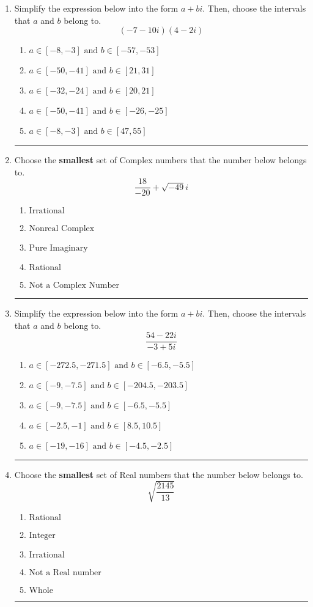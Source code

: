 \documentclass[14pt]{extbook}
\newcommand{\litem}[1]{\item#1\hspace*{-1cm}\rule{\textwidth}{0.4pt}}
\begin{document}
\begin{enumerate}
\litem{
Simplify the expression below into the form $a+bi$. Then, choose the intervals that $a$ and $b$ belong to.\[ (-7 - 10 i)(4 - 2 i) \]\begin{enumerate}[label=\Alph*.]
\item \( a \in [-8, -3] \text{ and } b \in [-57, -53] \)
\item \( a \in [-50, -41] \text{ and } b \in [21, 31] \)
\item \( a \in [-32, -24] \text{ and } b \in [20, 21] \)
\item \( a \in [-50, -41] \text{ and } b \in [-26, -25] \)
\item \( a \in [-8, -3] \text{ and } b \in [47, 55] \)

\end{enumerate} }
\litem{
Choose the \textbf{smallest} set of Complex numbers that the number below belongs to.\[ \frac{18}{-20}+\sqrt{-49}i \]\begin{enumerate}[label=\Alph*.]
\item \( \text{Irrational} \)
\item \( \text{Nonreal Complex} \)
\item \( \text{Pure Imaginary} \)
\item \( \text{Rational} \)
\item \( \text{Not a Complex Number} \)

\end{enumerate} }
\litem{
Simplify the expression below into the form $a+bi$. Then, choose the intervals that $a$ and $b$ belong to.\[ \frac{54 - 22 i}{-3 + 5 i} \]\begin{enumerate}[label=\Alph*.]
\item \( a \in [-272.5, -271.5] \text{ and } b \in [-6.5, -5.5] \)
\item \( a \in [-9, -7.5] \text{ and } b \in [-204.5, -203.5] \)
\item \( a \in [-9, -7.5] \text{ and } b \in [-6.5, -5.5] \)
\item \( a \in [-2.5, -1] \text{ and } b \in [8.5, 10.5] \)
\item \( a \in [-19, -16] \text{ and } b \in [-4.5, -2.5] \)

\end{enumerate} }
\litem{
Choose the \textbf{smallest} set of Real numbers that the number below belongs to.\[ \sqrt{\frac{2145}{13}} \]\begin{enumerate}[label=\Alph*.]
\item \( \text{Rational} \)
\item \( \text{Integer} \)
\item \( \text{Irrational} \)
\item \( \text{Not a Real number} \)
\item \( \text{Whole} \)


\end{enumerate}}
\end{enumerate}
\end{document}
